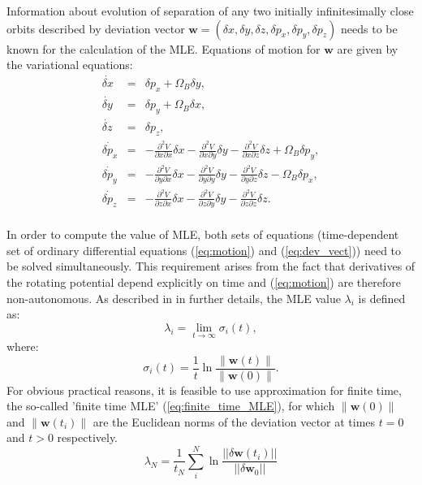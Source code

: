 \documentclass[a4paper,fleqn,usenatbib]{mnras}
\begin{document}
Information about evolution of separation of any two initially infinitesimally close orbits described by deviation vector $\mathbf{w}=(\delta x,\delta y,\delta z,\delta p_{x},\delta p_{y},\delta
p_{z})$ needs to be known for the calculation of the MLE. Equations of motion for $\mathbf{w}$ are given by the
variational equations:
\begin{equation}\label{eq:dev_vect}
	\begin{array}{lcl}
	\dot{\delta x} &=& \displaystyle \delta p_{x} + \Omega_B \delta y,  \\
	\dot{\delta y} &=& \displaystyle \delta p_{y} + \Omega_B \delta x,  \\
	\dot{\delta z} &=& \displaystyle\delta p_{z},\\
	\dot{\delta p_{x}} &=& \displaystyle- \frac{\partial^2 V}{\partial x \partial x}\delta x -
	\frac{\partial^2 V}{\partial x \partial y}\delta
	y - \frac{\partial^2 V}{\partial x \partial z} \delta z + \Omega_B \delta p_{y}, \\
	\dot{\delta p_{y}} &=& \displaystyle- \frac{\partial^2 V}{\partial y \partial x}\delta x -
	\frac{\partial^2 V}{\partial y \partial y}\delta
	y - \frac{\partial^2 V}{\partial y \partial z} \delta z - \Omega_B \delta p_{x}, \\
	\dot{\delta p_{z}} &=& \displaystyle- \frac{\partial^2 V}{\partial z \partial x}\delta x -
	\frac{\partial^2 V}{\partial z \partial y}\delta y - \frac{\partial^2 V}{\partial z \partial z} \delta z. \\
	\end{array}
\end{equation}

In order to compute the value of MLE, both sets of equations (time-dependent set of ordinary differential equations (\ref{eq:motion}) and (\ref{eq:dev_vect})) need to be solved simultaneously. This requirement arises from the fact that derivatives of the rotating potential depend explicitly on time and (\ref{eq:motion}) are therefore non-autonomous.
As described in \cite{BinneyTremaine:2008,APW_SuperFreq:2016} in further details, the MLE value $ \lambda_i $ is defined as:
\begin{equation}
	\label{LE}
	\lambda_i =\lim_{t \rightarrow \infty} \sigma_i(t),
\end{equation}
where:
\begin{equation}
	\label{sigma_i}
	\sigma_i(t)= \frac{1}{t}
	\ln \frac{\|\mathbf{w}(t)\|}{\|\mathbf{w}(0)\|}.
\end{equation}
For obvious practical reasons, it is feasible to use approximation for finite time, the so-called 'finite time MLE' (\ref{eq:finite_time_MLE}), for which $\|\mathbf{w}(0)\|$ and $\|\mathbf{w}(t_i)\|$ are the Euclidean norms of the deviation vector at times
$t=0$ and $t>0$ respectively.
\begin{equation}\label{eq:finite_time_MLE}
	\lambda_N = \frac{1}{t_N} \sum_{i}^{N} \ln \frac{|| \delta \textbf{w}(t_i)||}{||\delta \textbf{w} _0||}
\end{equation}
\end{document}

